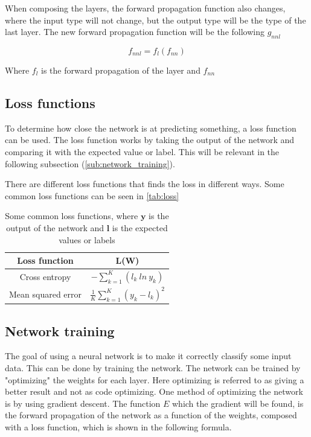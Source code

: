 When composing the layers, the forward propagation function also changes, where the input type will not change, but the output type will be the type of the last layer.
The new forward propagation function will be the following $g_{nnl}$

$$f_{nnl} = f_l(f_{nn})$$

Where $f_l$ is the forward propagation of the layer and $f_{nn}$

\subsection{Loss functions}%
\label{sub:Loss functions}

To determine how close the network is at predicting something, a loss function can be used.
The loss function works by taking the output of the network and comparing it with the expected value or label.
This will be relevant in the following subsection (\autoref{sub:network_training}).

There are different loss functions that finds the loss in different ways. Some common loss functions can be seen in \autoref{tab:loss}

\begin{table}[ht]
\centering
\begin{tabular}{|c|c|}
\hline
\textbf{Loss function}  & \textbf{L(W)} \\ \hline
Cross entropy  & $-\sum^K_{k=1}(l_k\ ln\ y_k)$ \\ \hline
Mean squared error & $\frac{1}{K}\sum^K_{k=1}(y_k-l_k)^2$ \\ \hline
\end{tabular}
\caption{Some common loss functions, where $\bm{y}$ is the output of the network and $\bm{l}$ is the expected values or labels}
\label{tab:loss}
\end{table}

\subsection{Network training}%
\label{sub:network_training}

The goal of using a neural network is to make it correctly classify some input data. This can be done by training the network.
The network can be trained by "optimizing" the weights for each layer. Here optimizing is referred to as giving a better result and not as code optimizing.
One method of optimizing the network is by using gradient descent.
The function $E$ which the gradient will be found, is the forward propagation of the network as a function of the weights, composed with a loss function, which is shown in the following formula.


